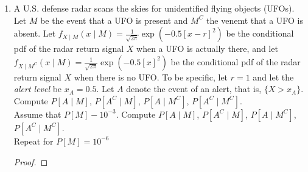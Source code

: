 \documentclass[paper=usletter, fontsize=12pt]{article}
\begin{document}
\begin{enumerate}
        \item A U.S. defense radar scans the skies for unidentified flying
        objects (UFOs). Let $M$ be the event that a UFO is present and $M^C$
        the venemt that a UFO is absent. Let $f_{X \mid M}(x \mid
        M)=\frac{1}{\sqrt{2\pi}}\exp(-0.5[x-r]^2)$ be the conditional pdf of
        the radar return signal $X$ when a UFO is actually there, and let $f_{X
        \mid M^C}(x \mid M)=\frac{1}{\sqrt{2\pi}}\exp(-0.5[x]^2)$ be the
        conditional pdf of the radar return signal $X$ when there is no UFO. To
        be specific, let $r=1$ and let the \textit{alert level} be $x_A=0.5$.
        Let $A$ denote the event of an alert, that is, $\{X>x_A\}$. Compute
        $P[A\mid M]$, $P[A^C\mid M]$, $P[A\mid M^C]$, $P[A^C\mid M^C]$.\\
        Assume that $P[M]-10^{-3}$. Compute $P[A\mid M]$, $P[A^C\mid M]$,
        $P[A\mid M^C]$, $P[A^C\mid M^C]$.\\
        Repeat for $P[M]=10^{-6}$
        \begin{proof}
        \end{proof}

    \end{enumerate}
\end{document}
